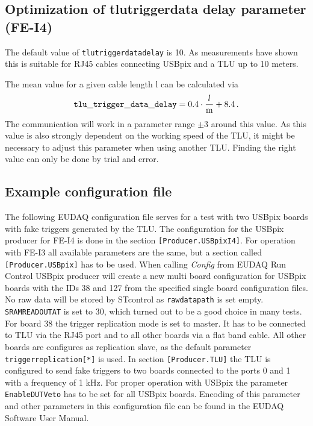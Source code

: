 \documentclass[a4paper,12pt]{article}
\begin{document}
\subsection{Optimization of tlu\textunderscore trigger\textunderscore data\textunderscore 
delay parameter (FE-I4)}

The default value of {\tt tlu\textunderscore trigger\textunderscore data\textunderscore delay}
is 10. As measurements have shown this
is suitable for RJ45 cables connecting USBpix and a TLU up to 10 meters.

The mean value for a given cable length l can be calculated via 
\[ {\tt tlu\_ trigger\_ data\_ delay}= 0.4\cdot \frac{l}{\rm m}+8.4\, .\]
The communication will work in a parameter range $\pm 3$ 
around this value.
As this value is also strongly dependent on the working speed of the TLU, it might
be necessary to adjust this parameter when using another TLU. Finding the right value
can only be done by trial and error.

\subsection{Example configuration file}\label{sec:exacfg}

The following EUDAQ configuration file serves for a test with two USBpix boards with
fake triggers generated by the TLU.
The configuration for the USBpix producer for FE-I4 is done in the section 
{\tt [Producer.USBpixI4]}. For operation with FE-I3 all available parameters are the same, but a
section called {\tt [Producer.USBpix]} has to be used. When calling {\it Config} from EUDAQ
Run Control USBpix producer will create a new multi board configuration for USBpix
boards with the IDs 38 and 127 from the specified single board configuration files. No raw
data will be stored by STcontrol as {\tt rawdata\textunderscore path} is set empty. 
{\tt SRAM\textunderscore READOUT\textunderscore AT}
is set to 30, which turned out to be a good choice in many tests. For board 38 the trigger
replication mode is set to master. It has to be connected to TLU via the RJ45 port and
to all other boards via a flat band cable. All other boards are configures as replication
slave, as the default parameter {\tt trigger\textunderscore replication[*]} is used.
In section {\tt [Producer.TLU]} the TLU is configured to send fake triggers to two boards
connected to the ports 0 and 1 with a frequency of 1 kHz. For proper operation with
USBpix the parameter {\tt EnableDUTVeto} has to be set for all USBpix boards. Encoding
of this parameter and other parameters in this configuration file can be found in the
EUDAQ Software User Manual.
\end{document}
